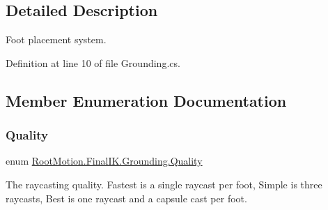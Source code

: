 \subsection{Detailed Description}
Foot placement system. 



Definition at line 10 of file Grounding.\+cs.



\subsection{Member Enumeration Documentation}
\mbox{\label{class_root_motion_1_1_final_i_k_1_1_grounding_ad216a50d7c69e8851cba32c52db05bf0}} 
\subsubsection{\texorpdfstring{Quality}{Quality}}
{\footnotesize\ttfamily enum \mbox{\hyperlink{class_root_motion_1_1_final_i_k_1_1_grounding_ad216a50d7c69e8851cba32c52db05bf0}{Root\+Motion.\+Final\+I\+K.\+Grounding.\+Quality}}\hspace{0.3cm}{\ttfamily [strong]}}



The raycasting quality. Fastest is a single raycast per foot, Simple is three raycasts, Best is one raycast and a capsule cast per foot. 

